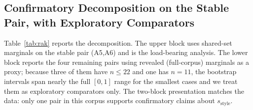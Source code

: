 \documentclass[11pt,a4paper]{article}
\newcommand{\Acc}[1]{\textsf{A#1}}
\begin{document}
\subsection{Confirmatory Decomposition on the Stable Pair, with Exploratory Comparators}
\label{sec:rak-table}

Table~\ref{tab:rak} reports the decomposition. The upper block uses
shared-set marginals on the stable pair (\Acc{5},\Acc{6}) and is the
load-bearing analysis. The lower block reports the four remaining
pairs using revealed (full-corpus) marginals as a proxy; because
three of them have $n\le 22$ and one has $n=11$, the bootstrap
intervals span nearly the full $[0,1]$ range for the smallest cases
and we treat them as exploratory comparators only. The
two-block presentation matches the data: only one pair in this
corpus supports confirmatory claims about $s_{\text{style}}$.
\end{document}
